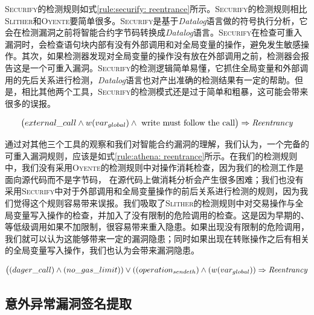 \textsc{Securify}的检测规则如式\ref{rule:securify: reentrance}所示。\textsc{Securify}的检测规则相比\textsc{Slither}和\textsc{Oyente}要简单很多。\textsc{Securify}是基于\emph{Datalog}语言做的符号执行分析，它会在检测漏洞之前将智能合约字节码转换成\emph{Datalog}语言。\textsc{Securify}在检查可重入漏洞时，会检查语句块内部有没有外部调用和对全局变量的操作，避免发生敏感操作。其次，如果检测器发现对全局变量的操作没有放在外部调用之前，检测器会报告这是一个可重入漏洞。\textsc{Securify}的检测逻辑简单易懂，它抓住全局变量和外部调用的先后关系进行检测，\emph{Datalog}语言也对产出准确的检测结果有一定的帮助。但是，相比其他两个工具，\textsc{Securify}的检测模式还是过于简单和粗暴，这可能会带来很多的误报。
\begin{mdframed}[
	linewidth = 1pt,
	innertopmargin = -10pt,
	innerbottommargin = 3pt,
	outerlinewidth = 1pt
	]
    \small
	\begin{equation} \label{rule:securify: reentrance}
    \big ( external\_call \wedge w(var_{global}) \wedge \text{ write must follow the call} \big ) \Rightarrow \text{\emph{Reentrancy}}
	\end{equation}
\end{mdframed}
通过对其他三个工具的观察和我们对智能合约漏洞的理解，我们认为，一个完备的可重入漏洞规则，应该是如式\ref{rule:athena: reentrance}所示。在我们的检测规则中，我们没有采用\textsc{Oyente}的检测规则中对操作消耗检查，因为我们的检测工作是面向源代码而不是字节码， 在源代码上做消耗分析会产生很多困难；我们也没有采用\textsc{Securify}中对于外部调用和全局变量操作的前后关系进行检测的规则，因为我们觉得这个规则容易带来误报。我们吸取了\textsc{Slither}的检测规则中对交易操作与全局变量写入操作的检查，并加入了没有限制的危险调用的检查。这是因为早期的、等低级调用如果不加限制，很容易带来重入隐患。如果出现没有限制的危险调用，我们就可以认为这能够带来一定的漏洞隐患；同时如果出现在转账操作之后有相关的全局变量写入操作，我们也认为会带来漏洞隐患。
\begin{mdframed}[
	linewidth = 1pt,
	innertopmargin = -10pt,
	innerbottommargin = 3pt,
	outerlinewidth = 1pt
	]
    \small
	\begin{equation} \label{rule:athena: reentrance}
    \big ((dager\_call) \wedge (no\_gas\_limit)) \vee ((operation_{sendeth}) \wedge (w(var_{global})) \Rightarrow \text{\emph{Reentrancy}}
	\end{equation}
\end{mdframed}

\subsection{意外异常漏洞签名提取}

